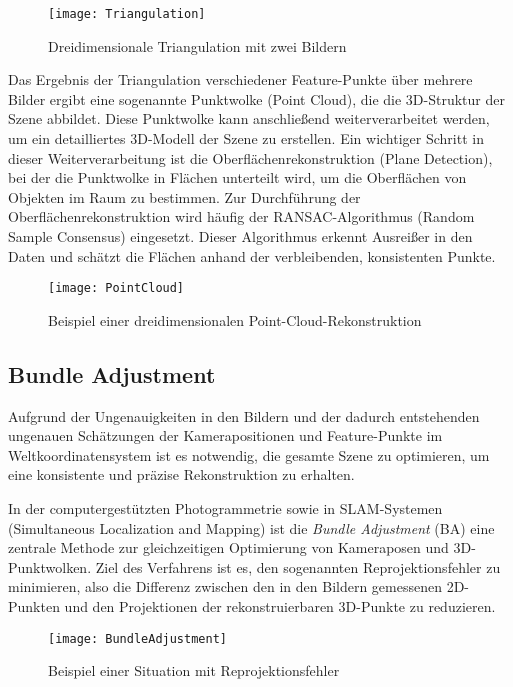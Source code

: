 \begin{figure}
    \centering
    \texttt{[image: Triangulation]}
    \caption{Dreidimensionale Triangulation mit zwei Bildern\label{fig:Triangulation}}\par
\end{figure}

Das Ergebnis der Triangulation verschiedener Feature-Punkte über mehrere Bilder ergibt eine sogenannte Punktwolke (Point Cloud), die die 3D-Struktur der Szene abbildet. Diese Punktwolke kann anschließend weiterverarbeitet werden, um ein detailliertes 3D-Modell der Szene zu erstellen. Ein wichtiger Schritt in dieser Weiterverarbeitung ist die Oberflächenrekonstruktion (Plane Detection), bei der die Punktwolke in Flächen unterteilt wird, um die Oberflächen von Objekten im Raum zu bestimmen. Zur Durchführung der Oberflächenrekonstruktion wird häufig der RANSAC-Algorithmus (Random Sample Consensus) eingesetzt. Dieser Algorithmus erkennt Ausreißer in den Daten und schätzt die Flächen anhand der verbleibenden, konsistenten Punkte.

\begin{figure}
    \centering
    \texttt{[image: PointCloud]}
    \caption{Beispiel einer dreidimensionalen Point-Cloud-Rekonstruktion\label{fig:PointCloud}}\par
\end{figure}

\subsection{Bundle Adjustment}

Aufgrund der Ungenauigkeiten in den Bildern und der dadurch entstehenden ungenauen Schätzungen der Kamerapositionen und Feature-Punkte im Weltkoordinatensystem ist es notwendig, die gesamte Szene zu optimieren, um eine konsistente und präzise Rekonstruktion zu erhalten. 

In der computergestützten Photogrammetrie sowie in SLAM-Systemen (Simultaneous Localization and Mapping) ist die \emph{Bundle Adjustment} (BA) eine zentrale Methode zur gleichzeitigen Optimierung von Kameraposen und 3D-Punktwolken. Ziel des Verfahrens ist es, den sogenannten Reprojektionsfehler zu minimieren, also die Differenz zwischen den in den Bildern gemessenen 2D-Punkten und den Projektionen der rekonstruierbaren 3D-Punkte zu reduzieren. 

\begin{figure}
    \centering
    \texttt{[image: BundleAdjustment]}
    \caption{Beispiel einer Situation mit Reprojektionsfehler\label{fig:BA}}\par
\end{figure}

